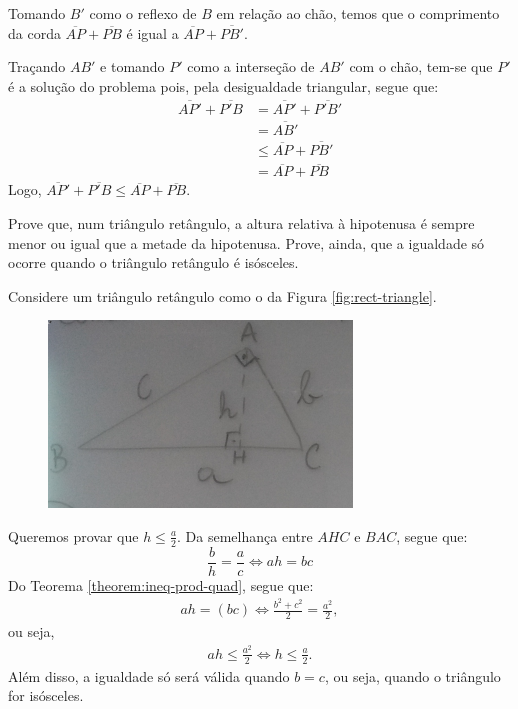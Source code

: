 \begin{solution}
Tomando $B'$ como o reflexo de $B$ em relação ao chão, temos que o comprimento da corda $\overline{AP} + \overline{PB}$ é igual a $\overline{AP} + \overline{PB'}$. 

Traçando $AB'$ e tomando $P'$ como a interseção de $AB'$ com o chão, tem-se que $P'$ é a solução do problema pois, pela desigualdade triangular, segue que:
%
\begin{align*}
\overline{AP'} +\overline{P'B} & = \overline{AP'} +\overline{P'B'} \\
& = \overline{AB'} \\
& \le \overline{AP} +\overline{PB'} \\
& = \overline{AP} +\overline{PB} 
\end{align*}
%
Logo, $\overline{AP'} +\overline{P'B} \le \overline{AP} +\overline{PB}$.
\end{solution}

\begin{example}
Prove que, num triângulo retângulo, a altura relativa à hipotenusa é sempre menor ou igual que a metade da hipotenusa. Prove, ainda, que
a igualdade só ocorre quando o triângulo retângulo é isósceles.
\end{example}

\begin{solution}
Considere um triângulo retângulo como o da Figura \ref{fig:rect-triangle}.
%
\label{fig:rect-triangle}
\begin{figure}[H]
\includegraphics{quadros/03_equacoes_e_inequacoes/09-04/cut1.png}
\centering
\end{figure}
%
Queremos provar que $h \le \frac a 2$. Da semelhança entre $AHC$ e $BAC$, segue que:
%
\begin{equation*} 
\frac b h = \frac a c \iff ah = bc
\end{equation*} 
%
Do Teorema \ref{theorem:ineq-prod-quad}, segue que:
%
\begin{align*}
ah = (bc) \iff \frac {b^2 + c^2} 2 = \frac {a^2} 2,
\end{align*}
%
ou seja, 
%
\begin{align*}
ah \le \frac {a^2} 2 \iff h \le \frac a 2.
\end{align*}
%
Além disso, a igualdade só será válida quando $b=c$, ou seja, quando o triângulo for isósceles.
\end{solution}

